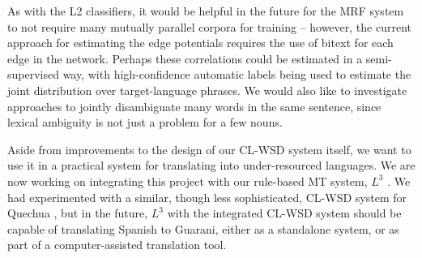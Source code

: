 \documentclass[11pt,letterpaper]{article}
\begin{document}
As with the L2 classifiers, it would be helpful in the future for the MRF
system to not require many mutually parallel corpora for training -- however,
the current approach for estimating the edge potentials requires the use of
bitext for each edge in the network. Perhaps these correlations could be
estimated in a semi-supervised way, with high-confidence automatic labels being
used to estimate the joint distribution over target-language phrases. We would
also like to investigate approaches to jointly disambiguate many words in the
same sentence, since lexical ambiguity is not just a problem for a few nouns.

Aside from improvements to the design of our CL-WSD system itself, we want to
use it in a practical system for translating into under-resourced languages.
We are now working on integrating this project with our rule-based MT system,
$L^3$ \cite{gasser:aflat2012}. We had experimented with a similar, though less
sophisticated, CL-WSD system for Quechua \cite{rudnick:2011:RANLPStud}, but in
the future, $L^3$ with the integrated CL-WSD system should be capable of
translating Spanish to Guarani, either as a standalone system, or as part of a
computer-assisted translation tool.



{}
\end{document}
